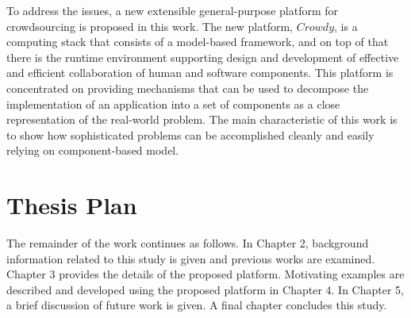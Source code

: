 To address the issues, a new extensible general-purpose platform for crowdsourcing 
is proposed in this work. The new platform, $Crowdy$, is a computing stack that 
consists of a model-based framework, and on top of that there is the runtime environment 
supporting design and development of effective and efficient collaboration of
human and software components. This platform is concentrated on providing 
mechanisms that can be used to decompose the implementation of an application 
into a set of components as a close representation of the real-world problem. 
The main characteristic of this work is to show how sophisticated problems can be 
accomplished cleanly and easily relying on component-based model.


\section{Thesis Plan}

The remainder of the work continues as follows. In Chapter 2, background information related to this study is given and previous works are examined. Chapter 3 provides the details of the proposed platform. Motivating examples are described and developed using the proposed platform in Chapter 4. In Chapter 5, a brief discussion of future work is given. A final chapter concludes this study.
